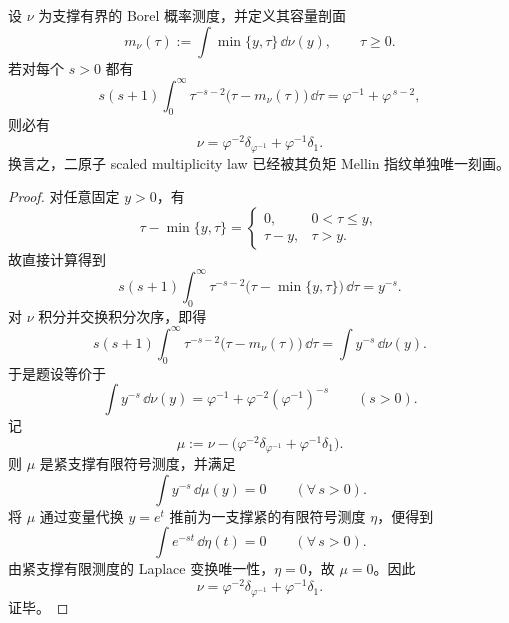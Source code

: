\begin{theorem}\label{thm:conclusion-negative-mellin-two-atom-uniqueness}
设 \(\nu\) 为支撑有界的 Borel 概率测度，并定义其容量剖面
\[
m_\nu(\tau):=\int \min\{y,\tau\}\,\dd\nu(y),
\qquad
\tau\ge 0.
\]
若对每个 \(s>0\) 都有
\[
s(s+1)\int_0^\infty \tau^{-s-2}\bigl(\tau-m_\nu(\tau)\bigr)\,\dd\tau
=
\varphi^{-1}+\varphi^{\,s-2},
\]
则必有
\[
\nu=\varphi^{-2}\delta_{\varphi^{-1}}+\varphi^{-1}\delta_1.
\]
换言之，二原子 scaled multiplicity law 已经被其负矩 Mellin 指纹单独唯一刻画。
\end{theorem}
\begin{proof}
对任意固定 \(y>0\)，有
\[
\tau-\min\{y,\tau\}=
\begin{cases}
0, & 0<\tau\le y,\\[2pt]
\tau-y, & \tau>y.
\end{cases}
\]
故直接计算得到
\[
s(s+1)\int_0^\infty \tau^{-s-2}\bigl(\tau-\min\{y,\tau\}\bigr)\,\dd\tau
=
y^{-s}.
\]
对 \(\nu\) 积分并交换积分次序，即得
\[
s(s+1)\int_0^\infty \tau^{-s-2}\bigl(\tau-m_\nu(\tau)\bigr)\,\dd\tau
=
\int y^{-s}\,\dd\nu(y).
\]
于是题设等价于
\[
\int y^{-s}\,\dd\nu(y)
=
\varphi^{-1}+\varphi^{-2}(\varphi^{-1})^{-s}
\qquad (s>0).
\]
记
\[
\mu:=\nu-\bigl(\varphi^{-2}\delta_{\varphi^{-1}}+\varphi^{-1}\delta_1\bigr).
\]
则 \(\mu\) 是紧支撑有限符号测度，并满足
\[
\int y^{-s}\,\dd\mu(y)=0
\qquad (\forall\,s>0).
\]
将 \(\mu\) 通过变量代换 \(y=e^t\) 推前为一支撑紧的有限符号测度 \(\eta\)，便得到
\[
\int e^{-st}\,\dd\eta(t)=0
\qquad (\forall\,s>0).
\]
由紧支撑有限测度的 Laplace 变换唯一性，\(\eta=0\)，故 \(\mu=0\)。因此
\[
\nu=\varphi^{-2}\delta_{\varphi^{-1}}+\varphi^{-1}\delta_1.
\]
证毕。
\end{proof}



